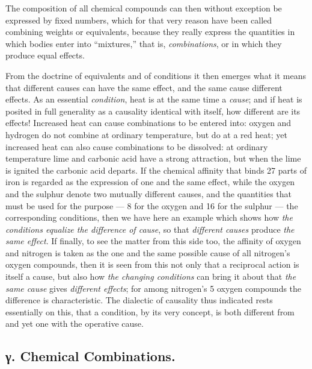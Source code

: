 \documentclass[12pt,a4paper]{book}
\begin{document}
The composition of all chemical compounds can then without exception be
expressed by fixed numbers, which for that very reason have been called
combining weights or equivalents, because they really express the quantities in
which bodies enter into ``mixtures,'' that is, \emph{combinations}, or in which
they produce equal effects.

From the doctrine of equivalents and of conditions it then emerges what it
means that different causes can have the same effect, and the same cause
different effects. As an essential \emph{condition}, heat is at the same time a
\emph{cause}; and if heat is posited in full generality as a causality
identical with itself, how different are its effects! Increased heat can cause
combinations to be entered into: oxygen and hydrogen do not combine at ordinary
temperature, but do at a red heat; yet increased heat can also cause
combinations to be dissolved: at ordinary temperature lime and carbonic acid
have a strong attraction, but when the lime is ignited the carbonic acid
departs. If the chemical affinity that binds 27 parts of iron is regarded as
the expression of one and the same effect, while the oxygen and the sulphur
denote two mutually different causes, and the quantities that must be used for
the purpose --- 8 for the oxygen
and 16 for the sulphur --- the corresponding conditions, then we have here an
example which shows how \emph{the conditions equalize the difference of cause},
so that \emph{different causes} produce \emph{the same effect}. If finally, to
see the matter from this side too, the affinity of oxygen and nitrogen is taken
as the one and the same possible cause of all nitrogen's oxygen compounds, then
it is seen from this not only that a reciprocal action is itself a cause, but
also how \emph{the changing conditions} can bring it about that \emph{the same
cause} gives \emph{different effects}; for among nitrogen's 5 oxygen compounds
the difference is
characteristic. The dialectic of causality thus indicated rests essentially on
this, that a condition, by its very concept, is both different from and yet one
with the operative cause.

\subsection*{γ. Chemical Combinations.}
\end{document}
